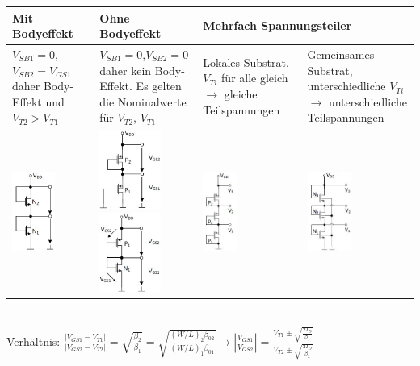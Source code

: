 \begin{tabular}{|p{}|p{}|p{}|p{}|}
	\hline
	\textbf{Mit Bodyeffekt}&\textbf{Ohne Bodyeffekt}&\multicolumn{2}{l|}{\textbf{Mehrfach Spannungsteiler}}\\ \hline
	$V_{SB1}=0$, $V_{SB2}=V_{GS1}$ daher Body-Effekt und $V_{T2} > V_{T1}$&$V_{SB1}=0$,$V_{SB2}=0$ daher kein Body-Effekt. Es gelten die Nominalwerte für $V_{T2}$, $V_{T1}$&Lokales Substrat, $V_{Ti}$ für alle gleich $\rightarrow$ gleiche Teilspannungen&Gemeinsames Substrat, unterschiedliche $V_{Ti}$ $\rightarrow$ unterschiedliche Teilspannungen\\
	\includegraphics[height=2.6cm]{chapters/Diode/images/SpgT_N_Bodyeffekt}&
	\includegraphics[height=2.6cm]{chapters/Diode/images/SpgT_P_body}
	\includegraphics[height=2.6cm]{chapters/Diode/images/SpgT_PN}&
	\includegraphics[height=2.6cm]{chapters/Diode/images/SpgT_P3}&
	\includegraphics[height=2.6cm]{chapters/Diode/images/SpgT_N3}\\    
	\hline	
\end{tabular} \\ [1ex]
Verhältnis: $\frac{\left|V_{GS1}-V_{T1}\right|}{\left|V_{GS2}-V_{T2}\right|}=\sqrt{\frac{\beta_2}{\beta_1}}=\sqrt{\frac{(W/L)_2\beta_{02}}{{(W/L)_1\beta_{01}}}}\rightarrow \left|\frac{V_{GS1}}{V_{GS2}}\right|=\frac{V_{T1}\pm\sqrt{\frac{2I_D}{\beta_1}}}{V_{T2}\pm\sqrt{\frac{2I_D}{\beta_2}}}$